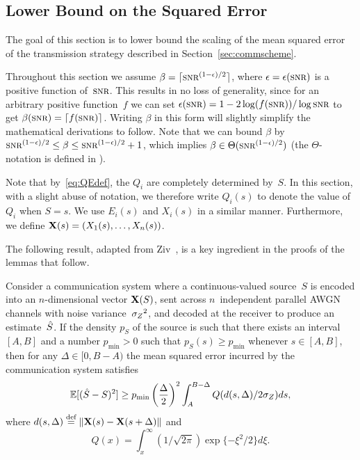 \subsection{Lower Bound on the Squared Error}\label{sec:scalarlowerbound}

The goal of this section is to lower bound the scaling of the mean squared error
of the transmission strategy described in Section~\ref{sec:commscheme}.

\begin{remark}
  \label{rem:betaepswlog}
  Throughout this section we assume $\beta = \lceil \snr^{(1-\e)/2}\rceil$,
  where $\e = \e(\snr)$ is a positive function of~$\snr$. This results in no
  loss of generality, since for an arbitrary positive function~$f$ we can set
  $\e(\snr) = 1-2 \log(f(\snr))/\log\snr$ to get $\beta(\snr) = \lceil f(\snr)
  \rceil$.  Writing $\beta$ in this form will slightly simplify the mathematical
  derivations to follow. Note that we can bound $\beta$ by $\snr^{(1-\e)/2} \le
  \beta \le \snr^{(1-\e)/2} + 1$, which implies $\beta \in
  \Theta(\snr^{(1-\e)/2})$ (the $\Theta$-notation is defined in
  ).
\end{remark}

Note that by~\eqref{eq:QEdef}, the $Q_i$ are completely determined by~$S$.
In this section, with a slight abuse of notation, we therefore write $Q_i(s)$ to
denote the value of~$Q_i$ when $S = s$. We use $E_i(s)$ and $X_i(s)$ in a
similar manner. Furthermore, we define $\mathbf{X}(s) = (X_1(s), \dots, X_n(s))$.

The following result, adapted from Ziv~\cite{Ziv1970}, is a key ingredient in
the proofs of the lemmas that follow.

\begin{lemma}
  \label{lem:zivbound}
  Consider a communication system where a con\-tin\-u\-ous-valued source~$S$ is
  encoded into an $n$-dimensional vector $\mathbf{X}(S)$, sent across $n$~independent
  parallel AWGN channels with noise variance~${{\sigma_Z}^2}$, and decoded at the receiver
  to produce an estimate~${\hat{S}}$.  If the density $p_S$ of the source is such that
  there exists an interval $[A,B]$ and a number $p_{\min} > 0$ such that $p_S(s)
  \ge p_{\min}$ whenever $s \in [A,B]$, then for any $\Delta \in [0,B-A)$ the
  mean squared error incurred by the communication system satisfies
  \begin{equation}
    \label{eq:zivbound}
    \mathbb{E}[({\hat{S}} - S)^2] \ge p_{\min} \left(\frac{\Delta}{2} \right)^2 
    \int_A^{B-\Delta} Q(d(s, \Delta) / 2 {\sigma_Z}) ds,
  \end{equation}
  where $d(s, \Delta) \stackrel{\text{def}}{=} \|\mathbf{X}(s) - \mathbf{X}(s+\Delta)\|$ and 
  \[Q(x) = \int_x^{\infty} (1/\sqrt{2\pi}) \exp\{-\xi^2/2\} d\xi.\]
\end{lemma}

